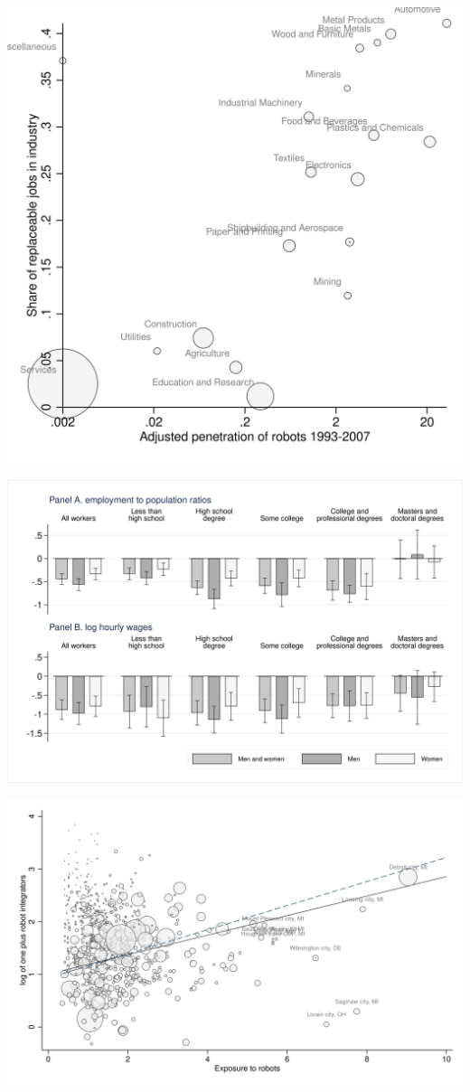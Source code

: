 \documentclass{article}
\begin{document}
\begin{center}\includegraphics[scale=0.15]{output/figure_industry_replaceable.png}\end{center}
\begin{center}\includegraphics[scale=0.15]{output/figure_inequality_longdifs.png}\end{center}
\begin{center}\includegraphics[scale=0.15]{output/figure_integrators.png}\end{center}
\end{document}
